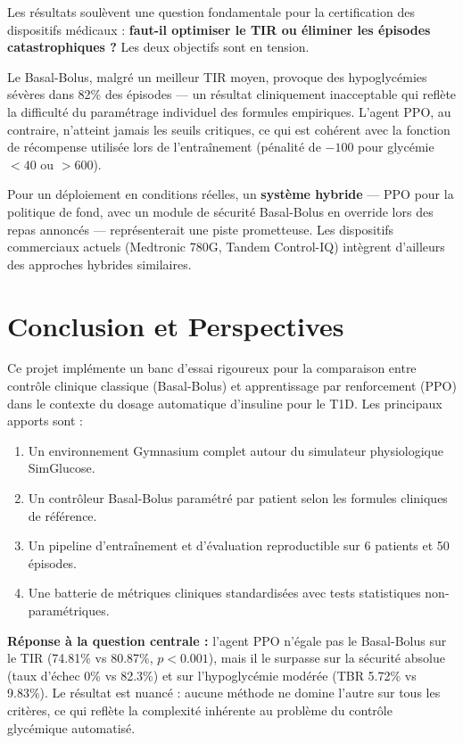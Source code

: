 \documentclass[a4paper,12pt]{report}
\begin{document}
Les résultats soulèvent une question fondamentale pour la certification des dispositifs médicaux : \textbf{faut-il optimiser le TIR ou éliminer les épisodes catastrophiques ?} Les deux objectifs sont en tension.

Le Basal-Bolus, malgré un meilleur TIR moyen, provoque des hypoglycémies sévères dans 82\% des épisodes --- un résultat cliniquement inacceptable qui reflète la difficulté du paramétrage individuel des formules empiriques. L'agent PPO, au contraire, n'atteint jamais les seuils critiques, ce qui est cohérent avec la fonction de récompense utilisée lors de l'entraînement (pénalité de $-100$ pour glycémie $< 40$ ou $> 600$).

Pour un déploiement en conditions réelles, un \textbf{système hybride} --- PPO pour la politique de fond, avec un module de sécurité Basal-Bolus en override lors des repas annoncés --- représenterait une piste prometteuse. Les dispositifs commerciaux actuels (Medtronic 780G, Tandem Control-IQ) intègrent d'ailleurs des approches hybrides similaires.

\newpage

\chapter{Conclusion et Perspectives}

Ce projet implémente un banc d'essai rigoureux pour la comparaison entre contrôle clinique classique (Basal-Bolus) et apprentissage par renforcement (PPO) dans le contexte du dosage automatique d'insuline pour le T1D. Les principaux apports sont :

\begin{enumerate}
  \item Un environnement Gymnasium complet autour du simulateur physiologique SimGlucose.
  \item Un contrôleur Basal-Bolus paramétré par patient selon les formules cliniques de référence.
  \item Un pipeline d'entraînement et d'évaluation reproductible sur 6 patients et 50 épisodes.
  \item Une batterie de métriques cliniques standardisées avec tests statistiques non-paramétriques.
\end{enumerate}

\textbf{Réponse à la question centrale :} l'agent PPO n'égale pas le Basal-Bolus sur le TIR (74.81\% vs 80.87\%, $p < 0.001$), mais il le surpasse sur la sécurité absolue (taux d'échec 0\% vs 82.3\%) et sur l'hypoglycémie modérée (TBR 5.72\% vs 9.83\%). Le résultat est nuancé : aucune méthode ne domine l'autre sur tous les critères, ce qui reflète la complexité inhérente au problème du contrôle glycémique automatisé.
\end{document}
